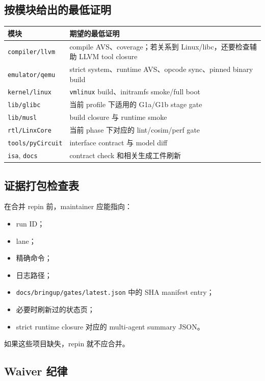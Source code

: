\documentclass[UTF8,11pt,a4paper]{ctexart}
\begin{document}
\subsection{按模块给出的最低证明}

\begin{longtable}{>{\raggedright\arraybackslash}p{} >{\raggedright\arraybackslash}p{}}
\toprule
模块 & 期望的最低证明 \\
\midrule
\endhead
\texttt{compiler/llvm} & compile AVS、coverage；若关系到 Linux/libc，还要检查辅助 LLVM tool closure \\
\texttt{emulator/qemu} & strict system、runtime AVS、opcode sync、pinned binary build \\
\texttt{kernel/linux} & \texttt{vmlinux} build、initramfs smoke/full boot \\
\texttt{lib/glibc} & 当前 profile 下适用的 G1a/G1b stage gate \\
\texttt{lib/musl} & build closure 与 runtime smoke \\
\texttt{rtl/LinxCore} & 当前 phase 下对应的 lint/cosim/perf gate \\
\texttt{tools/pyCircuit} & interface contract 与 model diff \\
\texttt{isa}, \texttt{docs} & contract check 和相关生成工件刷新 \\
\bottomrule
\end{longtable}

\subsection{证据打包检查表}

在合并 repin 前，maintainer 应能指向：

\begin{itemize}
  \item run ID；
  \item lane；
  \item 精确命令；
  \item 日志路径；
  \item \texttt{docs/bringup/gates/latest.json} 中的 SHA manifest entry；
  \item 必要时刷新过的状态页；
  \item strict runtime closure 对应的 multi-agent summary JSON。
\end{itemize}

如果这些项目缺失，repin 就不应合并。

\subsection{Waiver 纪律}
\end{document}
